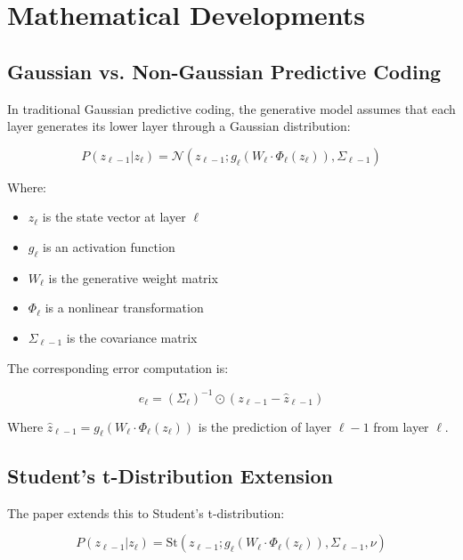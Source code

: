 \documentclass{article}
\begin{document}
\section{Mathematical Developments}

\subsection{Gaussian vs. Non-Gaussian Predictive Coding}

In traditional Gaussian predictive coding, the generative model assumes that each layer generates its lower layer through a Gaussian distribution:

\begin{equation}
  P(z_{\ell-1}|z_\ell) = \mathcal{N}(z_{\ell-1}; g_\ell(W_\ell \cdot \Phi_\ell(z_\ell)), \Sigma_{\ell-1})
\end{equation}

Where:
\begin{itemize}
  \item $z_\ell$ is the state vector at layer $\ell$
  \item $g_\ell$ is an activation function
  \item $W_\ell$ is the generative weight matrix
  \item $\Phi_\ell$ is a nonlinear transformation
  \item $\Sigma_{\ell-1}$ is the covariance matrix
\end{itemize}

The corresponding error computation is:

\begin{equation}
  e_\ell = (\Sigma_\ell)^{-1} \odot (z_{\ell-1} - \hat{z}_{\ell-1})
\end{equation}

Where $\hat{z}_{\ell-1} = g_\ell(W_\ell \cdot \Phi_\ell(z_\ell))$ is the prediction of layer $\ell-1$ from layer $\ell$.

\subsection{Student's t-Distribution Extension}

The paper extends this to Student's t-distribution:

\begin{equation}
  P(z_{\ell-1}|z_\ell) = \text{St}(z_{\ell-1}; g_\ell(W_\ell \cdot \Phi_\ell(z_\ell)), \Sigma_{\ell-1}, \nu)
\end{equation}
\end{document}
